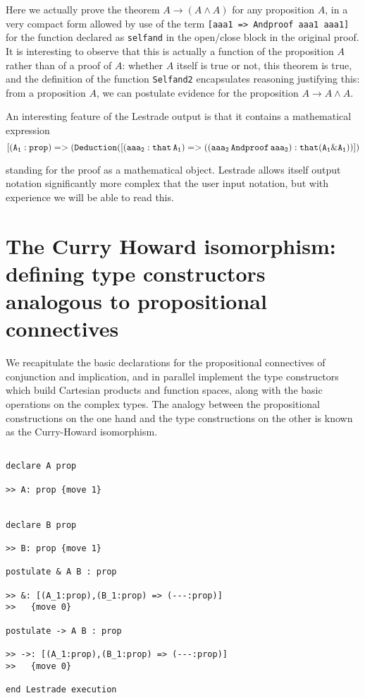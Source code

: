 \documentclass[12pt]{article}
\begin{document}
Here we actually prove the theorem $A \rightarrow (A \wedge A)$ for any proposition $A$, in a very compact form allowed by use of the term {\tt [aaa1 => Andproof aaa1 aaa1]} for the function declared as {\tt selfand} in the open/close block in the original proof.   It is interesting to observe that this is actually a function of the proposition $A$ rather than of a proof of $A$:  whether $A$ itself is true or not, this theorem is true, and the definition of the function {\tt Selfand2} encapsulates reasoning justifying this:  from a proposition $A$, we can postulate evidence for the proposition $A \rightarrow A \wedge A$.

An interesting feature of the Lestrade output is that it contains a mathematical expression $${\tt [(A_1:prop) => (Deduction([(aaa_2: that \,A_1) => ((aaa_2 \,Andproof\, aaa_2): that (A_1 \& A_1))])}$$

standing for the proof as a mathematical object.  Lestrade allows itself output notation significantly more complex that the user input notation, but with experience we will be able to read this.

\newpage

\section{The Curry Howard isomorphism:  defining type constructors analogous to propositional connectives}

We recapitulate the basic declarations for the propositional connectives of conjunction and implication, and in parallel implement the type constructors which build Cartesian products and function spaces, along with the basic operations on the complex types.  The analogy between the propositional constructions on the one hand and the type constructions on the other is known as the Curry-Howard isomorphism.

  \begin{verbatim}

declare A prop

>> A: prop {move 1}


declare B prop

>> B: prop {move 1}

postulate & A B : prop

>> &: [(A_1:prop),(B_1:prop) => (---:prop)]
>>   {move 0}

postulate -> A B : prop

>> ->: [(A_1:prop),(B_1:prop) => (---:prop)]
>>   {move 0}

end Lestrade execution
\end{verbatim}
\end{document}
